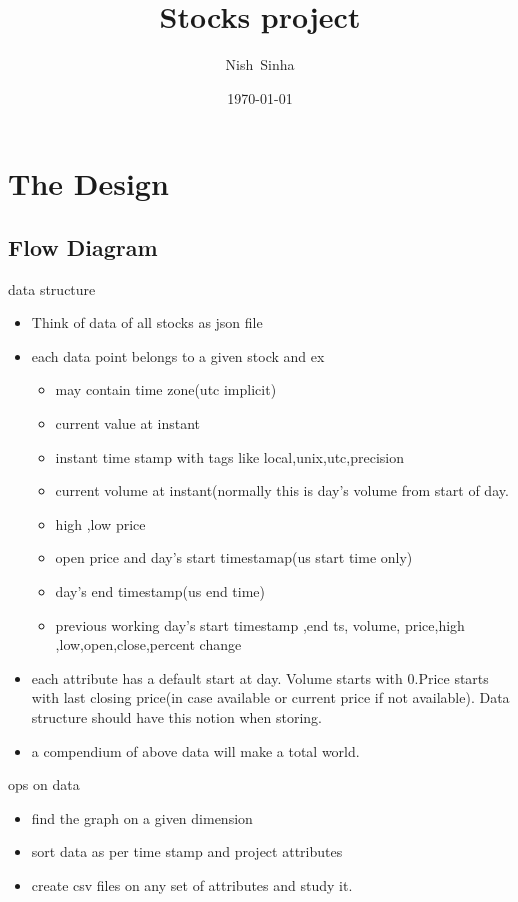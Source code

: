 \documentclass{beamer}
\title[Anomaly Detection System Overview]
{%
Stocks project
%
}
\author[Sinha N]
{
  Nish~Sinha\inst{1} \and
}
\institute[Xad]
{
  \inst{1}%
  Nsinha Inc.,  CA, USA
  \and
  \vskip-2mm
}
\date[\today]
{\today}
\begin{document}
\begin{frame}
  \titlepage
\end{frame}



\section{The Design}

\subsection{Flow Diagram }

\begin{frame}{data structure}

    \begin{itemize}
	\item Think of data of all stocks as json file
	\item each data point belongs to a given stock and ex
    		\begin{itemize}
			\item may contain time zone(utc implicit)
			\item current value at instant
			\item instant time stamp with tags like local,unix,utc,precision
			\item current volume at instant(normally this is day's volume from start of day.
			\item high ,low price
			\item open price and day's start timestamap(us start time only)
			\item day's end timestamp(us end time)
			\item previous working day's start timestamp ,end ts, volume, price,high ,low,open,close,percent change
		\end{itemize}
	\item each attribute has a default start at day. Volume starts with 0.Price starts with last closing price(in case available or current price if not available). Data structure should have this notion when storing. 
	\item a compendium of above data will make a total world. 
	
	\end{itemize}
	
\end{frame}

\begin{frame}{ops on data}

	\begin{itemize}
		\item find the graph on a given dimension
		\item sort data as per time stamp and project attributes 
		\item create csv files on any set of attributes and study it.
	\end{itemize}
\end{frame}
\end{document}
